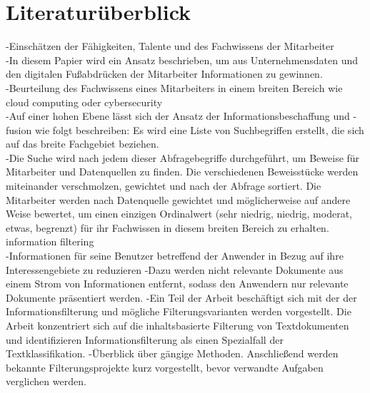 \chapter{Literaturüberblick}
\label{chap:literaturüberblick}


-Einschätzen der Fähigkeiten, Talente und des Fachwissens der Mitarbeiter\\
-In diesem Papier wird ein Ansatz beschrieben, um aus Unternehmensdaten und den digitalen Fußabdrücken der Mitarbeiter Informationen zu gewinnen.\\
-Beurteilung des Fachwissens eines Mitarbeiters in einem breiten Bereich wie cloud computing oder cybersecurity\\
-Auf einer hohen Ebene lässt sich der Ansatz der Informationsbeschaffung und -fusion wie folgt beschreiben: Es wird eine Liste von Suchbegriffen erstellt, die sich auf das breite Fachgebiet beziehen.\\
-Die Suche wird nach jedem dieser Abfragebegriffe durchgeführt, um Beweise für Mitarbeiter und Datenquellen zu finden. Die verschiedenen Beweisstücke werden miteinander verschmolzen, gewichtet und nach der Abfrage sortiert. Die Mitarbeiter werden nach Datenquelle gewichtet und möglicherweise auf andere Weise bewertet, um einen einzigen Ordinalwert (sehr niedrig, niedrig, moderat, etwas, begrenzt) für ihr Fachwissen in diesem breiten Bereich zu erhalten.\cite{horesh2016information} \\

information filtering\\
-Informationen für seine Benutzer betreffend der Anwender in Bezug auf ihre Interessengebiete zu reduzieren
-Dazu werden nicht relevante Dokumente aus einem Strom von Informationen entfernt, sodass den Anwendern nur relevante Dokumente präsentiert werden.
-Ein Teil der Arbeit beschäftigt sich mit der der Informationsfilterung und mögliche Filterungsvarianten werden vorgestellt. Die Arbeit konzentriert sich auf die inhaltsbasierte Filterung von Textdokumenten und identifizieren Informationsfilterung als einen Spezialfall der Textklassifikation.
-Überblick über gängige Methoden. Anschließend werden bekannte Filterungsprojekte kurz vorgestellt, bevor verwandte Aufgaben verglichen werden.
\cite{lanquillon2001enhancing}


